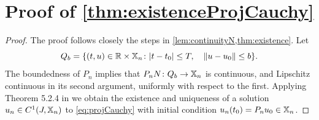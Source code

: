 \documentclass[a4paper,baskervaldx]{daarticle}
\begin{document}
\section{Proof of \texorpdfstring{\cref{thm:existenceProjCauchy}}{Existence solution Projected Cauchy}}\label{app:proof:thm:existenceProjCauchy}
\begin{proof}
  The proof follows closely the steps in \cref{lem:continuityN,thm:existence}. Let
  \[
    Q_b = 
  \{ (t,u) \in \mathbb{R} \times \mathbb{X}_n \colon |t - t_0| \leq T, \quad \| u -
    u_0 \| \leq b \}.
  \]
  The boundedness of $P_n$ implies that $P_n N \colon Q_b \to \mathbb{X}_n$ is continuous,
  and Lipschitz continuous in its second argument, uniformly with respect to the
  first. Applying Theorem 5.2.4 in \cite{atkinson2005theoretical} we obtain the
  existence and uniqueness of a solution $u_n \in C^1(J,\mathbb{X}_n)$ to
  \cref{eq:projCauchy} with initial condition $u_n(t_0) = P_n u_0 \in \mathbb{X}_n$.
\end{proof}




\end{document}
